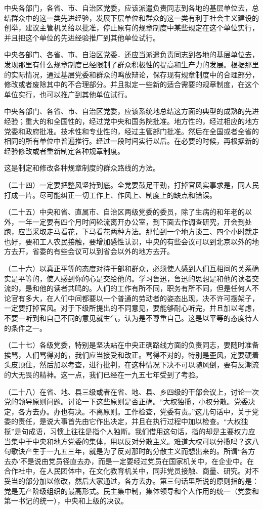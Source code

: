 中央各部门，各省、市、自治区党委，应该派遣负责同志到各地的基层单位去，总结群众中的这一类先进经验，发展下层单位和群众的这一类有利于社会主义建设的创举，建议主管机关给以批准，停止原有的规章制度中某些规定在这个单位实行，并且把这个单位的先进经验推广到其他单位试行。

中央各部门、各省、市、自治区党委．还应当派遣负责同志到各地的基层单位去，发现那里有什么规章制度已经限制了群众积极性的提高和生产力的发展。根据那里的实际情况，通过基层党委和群众的鸣放辩论，保存现有规章制度中的合理部分，修改或者废除其中的不合理部分。并且拟定一些新的适合需要的规章制度，在这个单位实行，也可以推广到其他单位试行。

中央各部门、各省、市、自治区党委，应该系统地总结这方面的典型的成熟的先进经验；重大的和全国性的，经过党中央和国务院批准。地方性的，经过相应的地方党委和政府批准。技术性和专业性的，经过主管部门批准。然后在全国或者全省的相同的所有单位中普遍推行。经过一段时间实行以后。在必要的时候，再根据新的经验修改或者重新制定各种规章制度。

这是制定和修改各种规章制度的群众路线的方法。

（二十四）一定要把整风坚持到底。全党要鼓足干劲，打掉官风实事求是，同人民打成一片。尽可能纠正一切工作上、作风上、制度上的缺点和错误。

（二十五）中央和省、直属市、自治区两级党委的委员，除了生病的和年老的以外，一年一定要有四个月时间轮流离开办公室，到下面去作调查研究，开会到处跑，应当采取走马看花，下马看花两种方法。那怕到一个地方谈三、四个小时就走也好，要和工人农民接触，要增加感性认识，中央的有些会议可以到北京以外的地方去开，省委的有些会议可以到省会以外的地方去开。

（二十六）以真正平等的态度对待干部和群众，必须使人感到人们互相间的关系确实是平等的，使人感到你的心是交给他的。学习鲁迅，鲁迅的思想是和他的读者交流的，是和他的读者共鸣的。人们的工作有所不同，职务有所不同，但是任何人不论官有多大，在人们中间都要以一个普通的劳动者的姿态出现，决不许可摆架子，一定要打掉官风。对于下级所提出的不同意见，要能够耐心听完，并且加以考虑，不要一听到和自己不同的意见就生气，认为是不尊重自己。这是以平等的态度待人的条件之一。

（二十七）各级党委，特别是坚决站在中央正确路线方面的负责同志，要随时准备挨骂，人们骂得对的，我们应当接受和改正。骂得不对的，特别是歪风，定要硬着头皮顶住，然后加以考查，进行批判，在这种情况下决不可以随风倒，要有反潮流的大无畏的精神。这一点，我们已经在一九五七年受到了考验。

（二十八）在省、地、县三级或者在省、地、县、乡四级的干部会议上，讨论一次党的领导原则问题。讨论一下这些原则是否正确。“大权独揽，小权分散。党委决定，各方去办。办也有决。不离原则。工作检查，党委有责。”这儿句话中，关于党委的责任，是说大事首先由它作出决定，并且在执行过程中加以检查。“大权独揽”是句成语，习惯上往往是指个人独断。我们借用这句话，指的却是主要权力应当集中于中央和地方党委的集体，用以反对分散主义。难道大权可以分揽吗？这八句歌诀产生于一九五三年，就是为了反对那时的分散主义而想出来的。所谓“各方去办’不是说由党员径直去办，而是一定要经过党员在国家机关中，在企业中。在合作社中，在人民团体中，在文化教育机关中，同非党员接触、商量、研究。对不妥当的部分加以修改，然后大家通过，各方去办。第三句话里所说的原则指的是：党是无产阶级组织的最高形式。民主集中制，集体领导和个人作用的统一（党委和第一书记的统一），中央和上级的决议。

